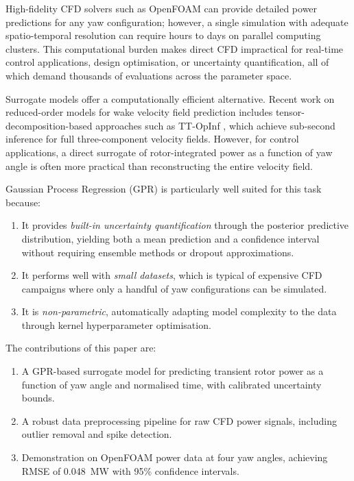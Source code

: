 \documentclass[12pt]{article}
\begin{document}
High-fidelity CFD solvers such as OpenFOAM \citep{OpenFOAM} can provide detailed power predictions for any yaw configuration; however, a single simulation with adequate spatio-temporal resolution can require hours to days on parallel computing clusters.
This computational burden makes direct CFD impractical for real-time control applications, design optimisation, or uncertainty quantification, all of which demand thousands of evaluations across the parameter space.

Surrogate models offer a computationally efficient alternative.
Recent work on reduced-order models for wake velocity field prediction includes tensor-decomposition-based approaches such as TT-OpInf \citep{Tabib2025ttopinf}, which achieve sub-second inference for full three-component velocity fields.
However, for control applications, a direct surrogate of rotor-integrated power as a function of yaw angle is often more practical than reconstructing the entire velocity field.

Gaussian Process Regression (GPR) \citep{Rasmussen2006} is particularly well suited for this task because:
\begin{enumerate}
    \item It provides \emph{built-in uncertainty quantification} through the posterior predictive distribution, yielding both a mean prediction and a confidence interval without requiring ensemble methods or dropout approximations.
    \item It performs well with \emph{small datasets}, which is typical of expensive CFD campaigns where only a handful of yaw configurations can be simulated.
    \item It is \emph{non-parametric}, automatically adapting model complexity to the data through kernel hyperparameter optimisation.
\end{enumerate}

The contributions of this paper are:
\begin{enumerate}
    \item A GPR-based surrogate model for predicting transient rotor power as a function of yaw angle and normalised time, with calibrated uncertainty bounds.
    \item A robust data preprocessing pipeline for raw CFD power signals, including outlier removal and spike detection.
    \item Demonstration on OpenFOAM power data at four yaw angles, achieving RMSE of 0.048~MW with 95\% confidence intervals.
\end{enumerate}
\end{document}
